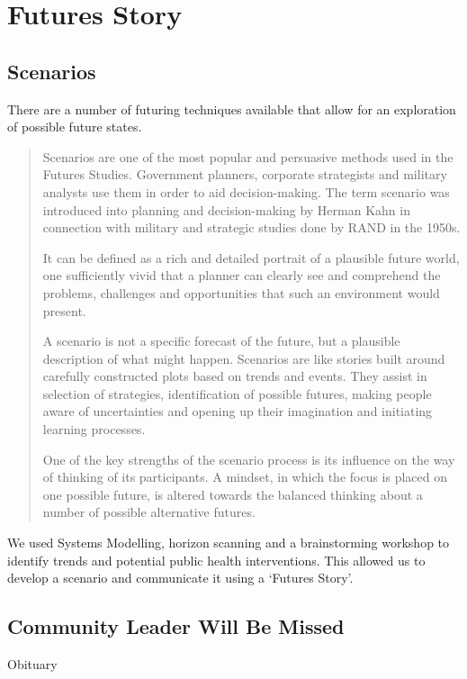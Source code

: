 \section{Futures Story}

\subsection{Scenarios}
There are a number of futuring techniques available that allow for an exploration of possible future states.

\begin{quotation}
	Scenarios are one of the most popular and persuasive methods used in the Futures Studies. Government planners, corporate strategists and military analysts use them in order to aid decision-making. The term scenario was introduced into planning and decision-making by Herman Kahn in connection with military and strategic studies done by RAND in the 1950s.
	
	It can be defined as a rich and detailed portrait of a plausible future world, one sufficiently vivid that a planner can clearly see and comprehend the problems, challenges and opportunities that such an environment would present.
	
	A scenario is not a specific forecast of the future, but a plausible description of what might happen. Scenarios are like stories built around carefully constructed plots based on trends and events. They assist in selection of strategies, identification of possible futures, making people aware of uncertainties and opening up their imagination and initiating learning processes.
	
	One of the key strengths of the scenario process is its influence on the way of thinking of its participants. A mindset, in which the focus is placed on one possible future, is altered towards the balanced thinking about a number of possible alternative futures.\cite{WikipediaSP}
\end{quotation}

We used Systems Modelling, horizon scanning and a brainstorming workshop to identify trends and potential public health interventions. This allowed us to develop a scenario and communicate it using a `Futures Story'.

\subsection{Community Leader Will Be Missed} 
Obituary

